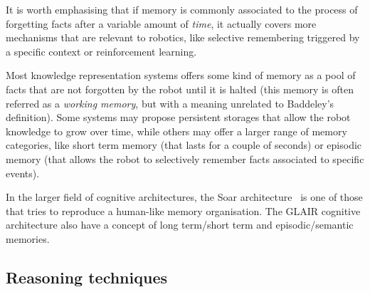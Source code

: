 \documentclass[a4paper, twocolumn]{article}
\begin{document}
It is worth emphasising that if memory is commonly associated to the process of
forgetting facts after a variable amount of \emph{time}, it actually covers
more mechanisms that are relevant to robotics, like selective remembering
triggered by a specific context or reinforcement learning.

Most knowledge representation systems offers some kind of memory as a pool of
facts that are not forgotten by the robot until it is halted (this memory is
often referred as a \emph{working memory}, but with a meaning unrelated to
Baddeley's definition). Some systems may propose persistent storages that allow
the robot knowledge to grow over time, while others may offer a larger range of
memory categories, like short term memory (that lasts for a couple of seconds)
or episodic memory (that allows the robot to selectively remember facts
associated to specific events).

In the larger field of cognitive architectures, the {\sc Soar}
architecture~\cite{Lehman2006} is one of those that tries to reproduce a
human-like memory organisation. The GLAIR cognitive architecture also have a
concept of long term/short term and episodic/semantic memories.

\subsection{Reasoning techniques}
\label{sect|reasoning}

\begin{scriptsize}
\begin{center}
\end{center}
\end{scriptsize}
\end{document}
